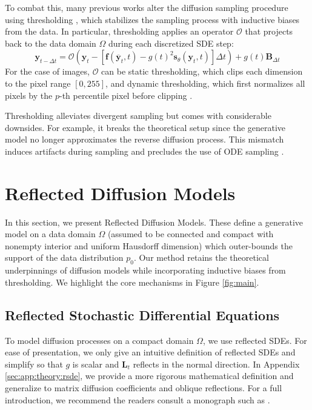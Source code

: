 \documentclass{article}
\theoremstyle{plain}
\theoremstyle{definition}
\theoremstyle{remark}
\newcommand{\sqbrac}[1]{\left[#1\right]}
\renewcommand{\vec}{\mathbf}
\begin{document}
To combat this, many previous works alter the diffusion sampling procedure using thresholding \citep{Saharia2022PhotorealisticTD, Li2022DiffusionLMIC}, which stabilizes the sampling process with inductive biases from the data. In particular, thresholding applies an operator $\mathcal{O}$ that projects back to the data domain $\Omega$ during each discretized SDE step:
\begin{equation}\label{eqn:thresholding}
    \vec{y}_{t - \Delta t} = \mathcal{O}(\vec{y}_t - \sqbrac{\vec{f}(\overline{\vec{y}}_t, t) - g(t)^2 \vec{s}_\theta(\vec{y}_t, t)} \Delta t) + g(t) \vec{B}_{\Delta t}
\end{equation}
For the case of images, $\mathcal{O}$ can be static thresholding, which clips each dimension to the pixel range $[0, 255]$, and dynamic thresholding, which first normalizes all pixels by the $p$-th percentile pixel before clipping \citep{Saharia2022PhotorealisticTD}.

Thresholding alleviates divergent sampling but comes with considerable downsides. For example, it breaks the theoretical setup since the generative model no longer approximates the reverse diffusion process. This mismatch induces artifacts during sampling and precludes the use of ODE sampling \citep{Song2020ScoreBasedGM}.
 \section{Reflected Diffusion Models}\label{sec:method}

In this section, we present Reflected Diffusion Models. These define a generative model on a data domain $\Omega$ (assumed to be connected and compact with nonempty interior and uniform Hausdorff dimension) which outer-bounds the support of the data distribution $p_0$. Our method retains the theoretical underpinnings of diffusion models while incorporating inductive biases from thresholding. We highlight the core mechanisms in Figure \ref{fig:main}.

\subsection{Reflected Stochastic Differential Equations}\label{sec:method:rsde}
To model diffusion processes on a compact domain $\Omega$, we use reflected SDEs. For ease of presentation, we only give an intuitive definition of reflected SDEs and simplify so that $g$ is scalar and $\vec{L}_t$ reflects in the normal direction. In Appendix \ref{sec:app:theory:rsde}, we provide a more rigorous mathematical definition and generalize to matrix diffusion coefficients and oblique reflections. For a full introduction, we recommend the readers consult a monograph such as \citet{Pilipenko2014AnIT}.
\end{document}
